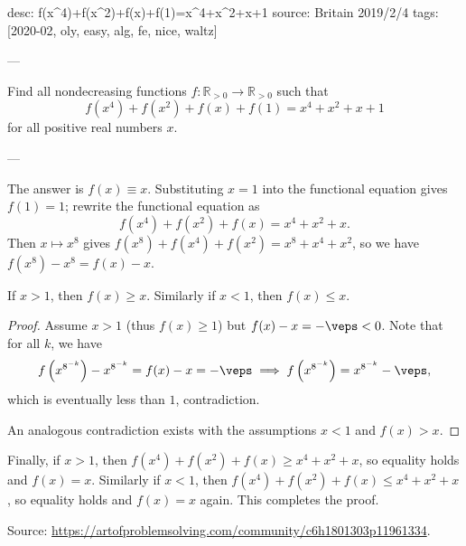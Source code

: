 desc: f(x^4)+f(x^2)+f(x)+f(1)=x^4+x^2+x+1
source: Britain 2019/2/4
tags: [2020-02, oly, easy, alg, fe, nice, waltz]

---

Find all nondecreasing functions $f:\mathbb R_{>0}\to\mathbb R_{>0}$ such that \[f(x^4)+f(x^2)+f(x)+f(1)=x^4+x^2+x+1\]
for all positive real numbers $x$. 

---

The answer is $f(x)\equiv x$. Substituting $x=1$ into the functional equation gives $f(1)=1$; rewrite the functional equation as \[f(x^4)+f(x^2)+f(x)=x^4+x^2+x.\]
Then $x\mapsto x^8$ gives $f(x^8)+f(x^4)+f(x^2)=x^8+x^4+x^2$, so we have $f(x^8)-x^8=f(x)-x$.
\begin{claim*}
    If $x>1$, then $f(x)\ge x$. Similarly if $x<1$, then $f(x)\le x$.
\end{claim*}
\begin{proof}
    Assume $x>1$ (thus $f(x)\ge1$) but $f(x)-x=-\veps<0$. Note that for all $k$, we have \[f\left(x^{8^{-k}}\right)-x^{8^{-k}}=f(x)-x=-\veps\implies f\left(x^{8^{-k}}\right)=x^{8^{-k}}-\veps,\]
    which is eventually less than $1$, contradiction.

    An analogous contradiction exists with the assumptions $x<1$ and $f(x)>x$.
\end{proof}

Finally, if $x>1$, then $f(x^4)+f(x^2)+f(x)\ge x^4+x^2+x$, so equality holds and $f(x)=x$. Similarly if $x<1$, then $f(x^4)+f(x^2)+f(x)\le x^4+x^2+x$, so equality holds and $f(x)=x$ again. This completes the proof.
\begin{remark}
    Source: \url{https://artofproblemsolving.com/community/c6h1801303p11961334}.
\end{remark}
